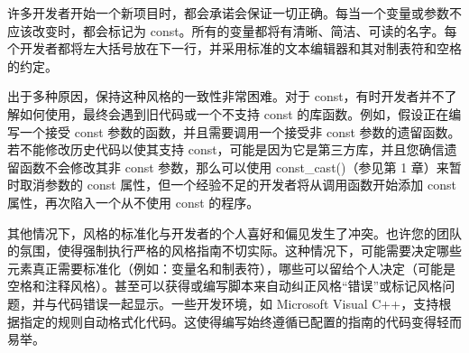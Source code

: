 许多开发者开始一个新项目时，都会承诺会保证一切正确。每当一个变量或参数不应该改变时，都会标记为 const。所有的变量都将有清晰、简洁、可读的名字。每个开发者都将左大括号放在下一行，并采用标准的文本编辑器和其对制表符和空格的约定。

出于多种原因，保持这种风格的一致性非常困难。对于 const，有时开发者并不了解如何使用，最终会遇到旧代码或一个不支持 const 的库函数。例如，假设正在编写一个接受 const 参数的函数，并且需要调用一个接受非 const 参数的遗留函数。若不能修改历史代码以使其支持 const，可能是因为它是第三方库，并且您确信遗留函数不会修改其非 const 参数，那么可以使用 const\_cast()（参见第 1 章）来暂时取消参数的 const 属性，但一个经验不足的开发者将从调用函数开始添加 const 属性，再次陷入一个从不使用 const 的程序。

其他情况下，风格的标准化与开发者的个人喜好和偏见发生了冲突。也许您的团队的氛围，使得强制执行严格的风格指南不切实际。这种情况下，可能需要决定哪些元素真正需要标准化（例如：变量名和制表符），哪些可以留给个人决定（可能是空格和注释风格）。甚至可以获得或编写脚本来自动纠正风格“错误”或标记风格问题，并与代码错误一起显示。一些开发环境，如 Microsoft Visual C++，支持根据指定的规则自动格式化代码。这使得编写始终遵循已配置的指南的代码变得轻而易举。